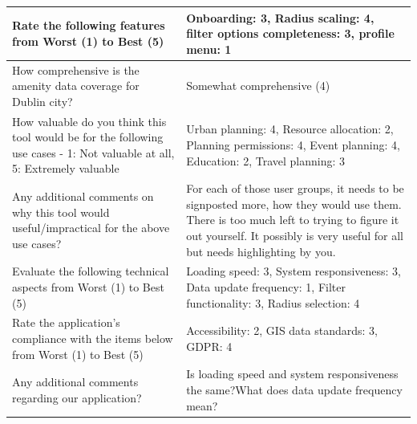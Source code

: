 \documentclass{report}
\begin{document}
\begin{table}[h!]
\begin{tabularx}{\textwidth}{|p{}|X|}
        Rate the following features from Worst (1) to Best (5)                                                                   & Onboarding: 3, Radius scaling: 4, filter options completeness: 3, profile menu: 1                                                                                                                                     \\ \hline
        How comprehensive is the amenity data coverage for Dublin city?                                                          & Somewhat comprehensive (4)                                                                                                                                                                                            \\ \hline
        How valuable do you think this tool would be for the following use cases - 1: Not valuable at all, 5: Extremely valuable & Urban planning: 4, Resource allocation: 2, Planning permissions: 4, Event planning: 4, Education: 2, Travel planning: 3                                                                                               \\ \hline
        Any additional comments on why this tool would useful/impractical for the above use cases?                               & For each of those user groups, it needs to be signposted more, how they would use them. There is too much left to trying to figure it out yourself. It possibly is very useful for all but needs highlighting by you. \\ \hline
        Evaluate the following technical aspects from Worst (1) to Best (5)                                                      & Loading speed: 3, System responsiveness: 3, Data update frequency: 1, Filter functionality: 3, Radius selection: 4                                                                                                    \\ \hline
        Rate the application's compliance with the items below from Worst (1) to Best (5)                                        & Accessibility: 2, GIS data standards: 3, GDPR: 4                                                                                                                                                                      \\ \hline
        Any additional comments regarding our application?                                                                       & Is loading speed and system responsiveness the same?What does data update frequency mean?
    \end{tabularx}
\end{table}
\end{document}
